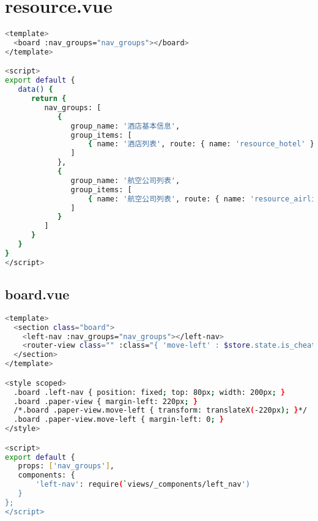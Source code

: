 \begin{lstlisting}[language=bash]

\end{lstlisting}


\section{resource.vue}

\begin{lstlisting}[language=bash]
<template>
  <board :nav_groups="nav_groups"></board>
</template>

<script>
export default {
   data() {
      return {
         nav_groups: [
            {
               group_name: '酒店基本信息',
               group_items: [
                   { name: '酒店列表', route: { name: 'resource_hotel' } }
               ]
            },
            {
               group_name: '航空公司列表',
               group_items: [
                   { name: '航空公司列表', route: { name: 'resource_airline'} }
               ]
            }
         ]
      }
   }
}
</script>
\end{lstlisting}




\subsection{board.vue}





\begin{lstlisting}[language=bash]
<template>
  <section class="board">
    <left-nav :nav_groups="nav_groups"></left-nav>
    <router-view class="" :class="{ 'move-left' : $store.state.is_cheat_sheet_show }"></router-view>
  </section>
</template>

<style scoped>
  .board .left-nav { position: fixed; top: 80px; width: 200px; }
  .board .paper-view { margin-left: 220px; }
  /*.board .paper-view.move-left { transform: translateX(-220px); }*/
  .board .paper-view.move-left { margin-left: 0; }
</style>

<script>
export default {
   props: ['nav_groups'],
   components: {
       'left-nav': require(`views/_components/left_nav')
   }
};
</script>
\end{lstlisting}






\begin{lstlisting}[language=bash]

\end{lstlisting}



